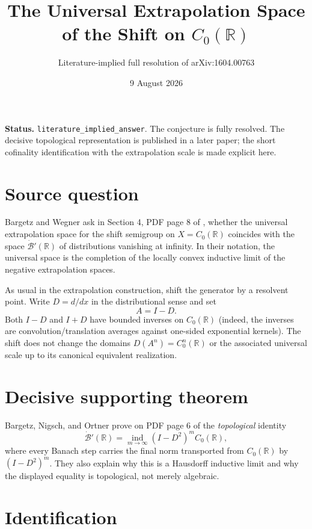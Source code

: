 \documentclass[10pt]{article}
\title{The Universal Extrapolation Space of the Shift on $C_0(\mathbb R)$}
\author{Literature-implied full resolution of arXiv:1604.00763}
\date{9 August 2026}
\newcommand{\Czero}{C_0(\mathbb R)}
\newcommand{\Bdot}{\dot{\mathcal B}'(\mathbb R)}
\newcommand{\indlim}{\mathop{\mathrm{ind}}\limits}
\begin{document}
\maketitle

\noindent
\colorbox{statusblue!10}{\parbox{0.95\linewidth}{
\textbf{Status.} \texttt{literature\_implied\_answer}.  The conjecture is
fully resolved.  The decisive topological representation is published in a
later paper; the short cofinality identification with the extrapolation scale
is made explicit here.
}}

\section*{Source question}

Bargetz and Wegner ask in Section 4, PDF page 8 of
\cite{BW}, whether the universal extrapolation space for the shift semigroup
on $X=\Czero$ coincides with the space $\Bdot$ of distributions vanishing at
infinity.  In their notation, the universal space is the completion of the
locally convex inductive limit of the negative extrapolation spaces.

As usual in the extrapolation construction, shift the generator by a
resolvent point.  Write $D=d/dx$ in the distributional sense and set
\[
 A=I-D.
\]
Both $I-D$ and $I+D$ have bounded inverses on $\Czero$ (indeed, the inverses
are convolution/translation averages against one-sided exponential kernels).
The shift does not change the domains $D(A^n)=C_0^n(\mathbb R)$ or the
associated universal scale up to its canonical equivalent realization.

\section*{Decisive supporting theorem}

Bargetz, Nigsch, and Ortner prove on PDF page 6 of \cite{BNO} the
\emph{topological} identity
\begin{equation}\label{eq:bno}
 \Bdot
 =\indlim_{m\to\infty}(I-D^2)^m\Czero,
\end{equation}
where every Banach step carries the final norm transported from $\Czero$ by
$(I-D^2)^m$.  They also explain why this is a Hausdorff inductive limit and
why the displayed equality is topological, not merely algebraic.

\section*{Identification}
\end{document}
